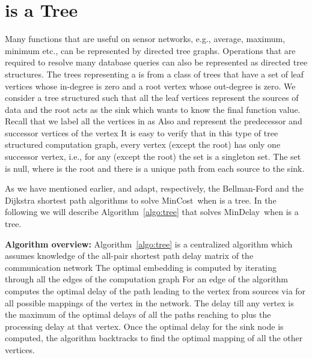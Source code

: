 \documentclass[journal]{IEEEtran}
\newcommand{\mincost}{\textsf{MinCost}}
\newcommand{\mindelay}{\textsf{MinDelay}}
\begin{document}
\section{ is a Tree}
\label{sec:tree}
Many functions that are useful on sensor networks, e.g., average,
maximum, minimum etc., can be represented by directed tree
graphs. Operations that are required to resolve many database queries
can also be represented as directed tree structures.  The trees
representing a  is from a class of trees that have a set
of leaf vertices whose in-degree is zero and a root vertex whose
out-degree is zero. We consider a tree structured  such
that all the leaf vertices represent the sources of data and the root
acts as the sink which wants to know the final function value. Recall
that we label all the vertices in  as
 Also  and
   represent the predecessor and successor
  vertices of the vertex  It is easy to
verify that in this type of tree structured computation graph, every
vertex (except the root) has only one successor vertex, i.e., for any
 (except the root) the set 
is a singleton set. The set  is null, where
 is the root and there is a unique path from each source to
the sink.

As we have mentioned earlier, \cite{Ying08} and \cite{Shah13} adapt,
respectively, the Bellman-Ford and the Dijkstra shortest path
algorithms to solve \mincost\ when  is a tree. In the
following we will describe Algorithm~\ref{algo:tree} that solves
\mindelay\ when  is a tree.

\textbf{Algorithm overview:} Algorithm~\ref{algo:tree} is a
centralized algorithm which assumes knowledge of the all-pair shortest
path delay matrix  of the communication network 
The optimal embedding is computed by iterating through all the edges
of the computation graph  For an edge
 of  the algorithm computes the
optimal delay of the path leading to the vertex  from
sources via  for all possible mappings of the vertex
 in the network. The delay till any vertex  is the
maximum of the optimal delays of all the paths reaching to 
plus the processing delay at that vertex. Once the optimal delay for
the sink node is computed, the algorithm backtracks to find the
optimal mapping of all the other vertices.
\end{document}
